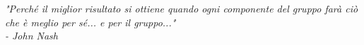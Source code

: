 \begin{titlepage}

\nonumber
\null {}
	\begin{flushright}
\textit{"Perché il miglior risultato si ottiene quando ogni componente del gruppo farà ciò che è meglio per sé... e per il gruppo..."\\- John Nash} \\[5mm]
	\end{flushright}



\end{titlepage}